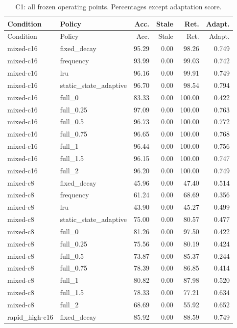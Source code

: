 \begin{longtable}{llrrrr}\caption{C1: all frozen operating points. Percentages except adaptation score.}\label{tab:C1}\\\toprule Condition & Policy & Acc. & Stale & Ret. & Adapt.\\\midrule\endfirsthead\toprule Condition & Policy & Acc. & Stale & Ret. & Adapt.\\\midrule\endhead
mixed-c16 & fixed\_decay & 95.29 & 0.00 & 98.26 & 0.749\\
mixed-c16 & frequency & 93.99 & 0.00 & 99.03 & 0.742\\
mixed-c16 & lru & 96.16 & 0.00 & 99.91 & 0.749\\
mixed-c16 & static\_state\_adaptive & 96.70 & 0.00 & 98.54 & 0.794\\
mixed-c16 & full\_0 & 83.33 & 0.00 & 100.00 & 0.422\\
mixed-c16 & full\_0.25 & 97.09 & 0.00 & 100.00 & 0.763\\
mixed-c16 & full\_0.5 & 96.73 & 0.00 & 100.00 & 0.772\\
mixed-c16 & full\_0.75 & 96.65 & 0.00 & 100.00 & 0.768\\
mixed-c16 & full\_1 & 96.44 & 0.00 & 100.00 & 0.756\\
mixed-c16 & full\_1.5 & 96.15 & 0.00 & 100.00 & 0.747\\
mixed-c16 & full\_2 & 96.20 & 0.00 & 100.00 & 0.749\\
mixed-c8 & fixed\_decay & 45.96 & 0.00 & 47.40 & 0.514\\
mixed-c8 & frequency & 61.24 & 0.00 & 68.69 & 0.356\\
mixed-c8 & lru & 43.90 & 0.00 & 45.27 & 0.499\\
mixed-c8 & static\_state\_adaptive & 75.00 & 0.00 & 80.57 & 0.477\\
mixed-c8 & full\_0 & 81.26 & 0.00 & 97.50 & 0.422\\
mixed-c8 & full\_0.25 & 75.56 & 0.00 & 80.19 & 0.424\\
mixed-c8 & full\_0.5 & 73.87 & 0.00 & 85.37 & 0.244\\
mixed-c8 & full\_0.75 & 78.39 & 0.00 & 86.85 & 0.414\\
mixed-c8 & full\_1 & 80.82 & 0.00 & 87.98 & 0.520\\
mixed-c8 & full\_1.5 & 78.33 & 0.00 & 77.21 & 0.634\\
mixed-c8 & full\_2 & 68.69 & 0.00 & 55.92 & 0.652\\
rapid\_high-c16 & fixed\_decay & 85.92 & 0.00 & 88.59 & 0.749\\

\end{longtable}
